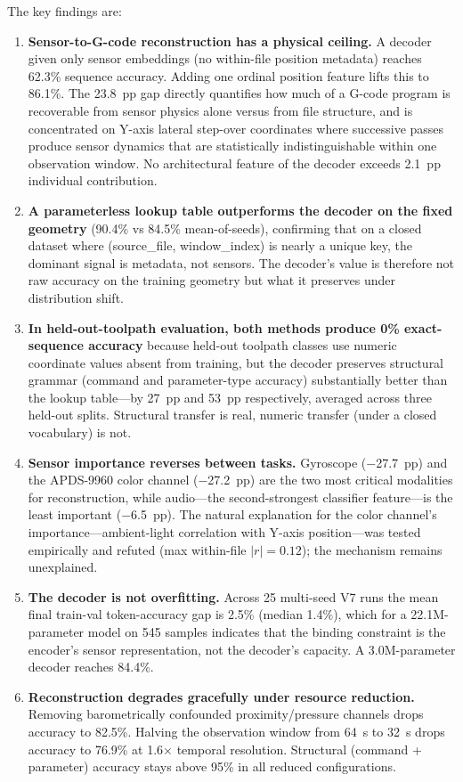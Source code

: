 \documentclass[sensors,article,submit,moreauthors,pdftex]{Definitions/mdpi}
\begin{document}
The key findings are:

\begin{enumerate}[leftmargin=*]
    \item \textbf{Sensor-to-G-code reconstruction has a physical ceiling.} A decoder given only sensor embeddings (no within-file position metadata) reaches 62.3\% sequence accuracy. Adding one ordinal position feature lifts this to 86.1\%. The 23.8~pp gap directly quantifies how much of a G-code program is recoverable from sensor physics alone versus from file structure, and is concentrated on Y-axis lateral step-over coordinates where successive passes produce sensor dynamics that are statistically indistinguishable within one observation window. No architectural feature of the decoder exceeds 2.1~pp individual contribution.
    \item \textbf{A parameterless lookup table outperforms the decoder on the fixed geometry} (90.4\% vs 84.5\% mean-of-seeds), confirming that on a closed dataset where (source\_file, window\_index) is nearly a unique key, the dominant signal is metadata, not sensors. The decoder's value is therefore not raw accuracy on the training geometry but what it preserves under distribution shift.
    \item \textbf{In held-out-toolpath evaluation, both methods produce 0\% exact-sequence accuracy} because held-out toolpath classes use numeric coordinate values absent from training, but the decoder preserves structural grammar (command and parameter-type accuracy) substantially better than the lookup table---by 27~pp and 53~pp respectively, averaged across three held-out splits. Structural transfer is real, numeric transfer (under a closed vocabulary) is not.
    \item \textbf{Sensor importance reverses between tasks.} Gyroscope ($-$27.7~pp) and the APDS-9960 color channel ($-$27.2~pp) are the two most critical modalities for reconstruction, while audio---the second-strongest classifier feature---is the least important ($-$6.5~pp). The natural explanation for the color channel's importance---ambient-light correlation with Y-axis position---was tested empirically and refuted (max within-file $|r| = 0.12$); the mechanism remains unexplained.
    \item \textbf{The decoder is not overfitting.} Across 25 multi-seed V7 runs the mean final train-val token-accuracy gap is 2.5\% (median 1.4\%), which for a 22.1M-parameter model on 545 samples indicates that the binding constraint is the encoder's sensor representation, not the decoder's capacity. A 3.0M-parameter decoder reaches 84.4\%.
    \item \textbf{Reconstruction degrades gracefully under resource reduction.} Removing barometrically confounded proximity/pressure channels drops accuracy to 82.5\%. Halving the observation window from 64~s to 32~s drops accuracy to 76.9\% at 1.6$\times$ temporal resolution. Structural (command + parameter) accuracy stays above 95\% in all reduced configurations.
\end{enumerate}
\end{document}
